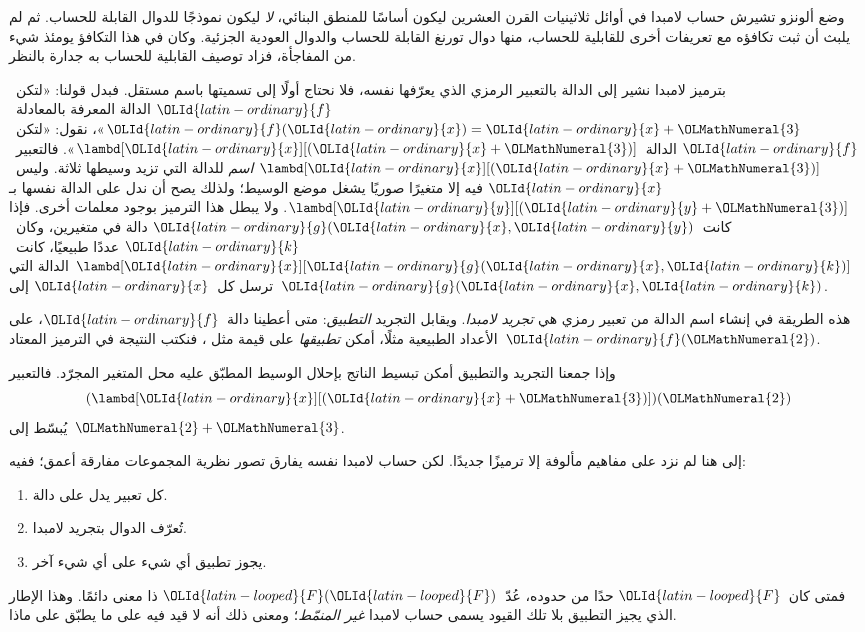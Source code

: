 \documentclass[../../../include/open-logic-section]{subfiles}
\begin{document}

وضع ألونزو تشيرش حساب لامبدا في أوائل ثلاثينيات القرن العشرين
ليكون أساسًا للمنطق البنائي، \emph{لا} ليكون نموذجًا للدوال القابلة
للحساب. ثم لم يلبث أن ثبت تكافؤه مع تعريفات أخرى للقابلية للحساب،
منها دوال تورنغ القابلة للحساب والدوال العودية الجزئية.
وكان في هذا التكافؤ يومئذ شيء من المفاجأة، فزاد توصيف القابلية
للحساب به جدارة بالنظر.

بترميز لامبدا نشير إلى الدالة بالتعبير الرمزي الذي يعرّفها نفسه،
فلا نحتاج أولًا إلى تسميتها باسم مستقل. فبدل قولنا:
«لتكن~${\OLId{latin-ordinary}{f}}$ الدالة المعرفة بالمعادلة~${\OLId{latin-ordinary}{f}}({\OLId{latin-ordinary}{x}}) = {\OLId{latin-ordinary}{x}} + {\OLMathNumeral{3}}$»، نقول:
«لتكن~${\OLId{latin-ordinary}{f}}$ الدالة~$\lambd[{\OLId{latin-ordinary}{x}}][({\OLId{latin-ordinary}{x}} + {\OLMathNumeral{3}})]$».
فالتعبير~$\lambd[{\OLId{latin-ordinary}{x}}][({\OLId{latin-ordinary}{x}}+{\OLMathNumeral{3}})]$ \emph{اسم} للدالة التي تزيد وسيطها
ثلاثة. وليس~${\OLId{latin-ordinary}{x}}$ فيه إلا متغيرًا صوريًا يشغل موضع الوسيط؛
ولذلك يصح أن ندل على الدالة نفسها بـ$\lambd[{\OLId{latin-ordinary}{y}}][({\OLId{latin-ordinary}{y}} + {\OLMathNumeral{3}})]$.
ولا يبطل هذا الترميز بوجود معلمات أخرى.
فإذا كانت~${\OLId{latin-ordinary}{g}}({\OLId{latin-ordinary}{x}}, {\OLId{latin-ordinary}{y}})$ دالة في متغيرين، وكان~${\OLId{latin-ordinary}{k}}$ عددًا طبيعيًا،
كانت~$\lambd[{\OLId{latin-ordinary}{x}}][{\OLId{latin-ordinary}{g}}({\OLId{latin-ordinary}{x}},{\OLId{latin-ordinary}{k}})]$ الدالة التي ترسل كل~${\OLId{latin-ordinary}{x}}$ إلى~${\OLId{latin-ordinary}{g}}({\OLId{latin-ordinary}{x}}, {\OLId{latin-ordinary}{k}})$.

هذه الطريقة في إنشاء اسم الدالة من تعبير رمزي هي
\emph{تجريد لامبدا}. ويقابل التجريد \emph{التطبيق}:
متى أعطينا دالة~${\OLId{latin-ordinary}{f}}$، على الأعداد الطبيعية مثلًا، أمكن
\emph{تطبيقها} على قيمة مثل ، فنكتب النتيجة في الترميز
المعتاد~${\OLId{latin-ordinary}{f}}({\OLMathNumeral{2}})$.

وإذا جمعنا التجريد والتطبيق أمكن تبسيط الناتج بإحلال الوسيط
المطبّق عليه محل المتغير المجرّد. فالتعبير
\[
(\lambd[{\OLId{latin-ordinary}{x}}][({\OLId{latin-ordinary}{x}} + {\OLMathNumeral{3}})])({\OLMathNumeral{2}})
\]
يُبسّط إلى~${\OLMathNumeral{2}} + {\OLMathNumeral{3}}$.

إلى هنا لم نزد على مفاهيم مألوفة إلا ترميزًا جديدًا.
لكن حساب لامبدا نفسه يفارق تصور نظرية المجموعات مفارقة أعمق؛
ففيه:
\begin{enumerate}
\item كل تعبير يدل على دالة.
\item تُعرّف الدوال بتجريد لامبدا.
\item يجوز تطبيق أي شيء على أي شيء آخر.
\end{enumerate}
فمتى كان~${\OLId{latin-looped}{F}}$ حدًا من حدوده، عُدّ~${\OLId{latin-looped}{F}}({\OLId{latin-looped}{F}})$ ذا معنى دائمًا.
وهذا الإطار الذي يجيز التطبيق بلا تلك القيود يسمى حساب
لامبدا \emph{غير المنمّط}؛ ومعنى ذلك أنه لا قيد فيه على ما
يطبّق على ماذا.
\end{document}
